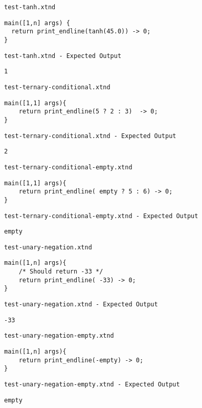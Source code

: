 \medskip \noindent \texttt{test-tanh.xtnd}


\begin{lstlisting}
main([1,n] args) {
  return print_endline(tanh(45.0)) -> 0;
}
\end{lstlisting}


\medskip \noindent \texttt{test-tanh.xtnd - Expected Output}


\begin{lstlisting}
1
\end{lstlisting}


\medskip \noindent \texttt{test-ternary-conditional.xtnd}


\begin{lstlisting}
main([1,1] args){
	return print_endline(5 ? 2 : 3)  -> 0;
}
\end{lstlisting}


\medskip \noindent \texttt{test-ternary-conditional.xtnd - Expected Output}


\begin{lstlisting}
2
\end{lstlisting}


\medskip \noindent \texttt{test-ternary-conditional-empty.xtnd}


\begin{lstlisting}
main([1,1] args){
	return print_endline( empty ? 5 : 6) -> 0;
}
\end{lstlisting}


\medskip \noindent \texttt{test-ternary-conditional-empty.xtnd - Expected Output}


\begin{lstlisting}
empty
\end{lstlisting}


\medskip \noindent \texttt{test-unary-negation.xtnd}


\begin{lstlisting}
main([1,n] args){
	/* Should return -33 */
	return print_endline( -33) -> 0;
}
\end{lstlisting}


\medskip \noindent \texttt{test-unary-negation.xtnd - Expected Output}


\begin{lstlisting}
-33
\end{lstlisting}


\medskip \noindent \texttt{test-unary-negation-empty.xtnd}


\begin{lstlisting}
main([1,n] args){
	return print_endline(-empty) -> 0;
}
\end{lstlisting}


\medskip \noindent \texttt{test-unary-negation-empty.xtnd - Expected Output}


\begin{lstlisting}
empty
\end{lstlisting}




